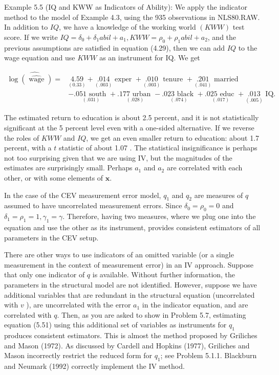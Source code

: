 \documentclass[10pt]{article}
\begin{document}
Example 5.5 (IQ and KWW as Indicators of Ability): We apply the indicator method to the model of Example 4.3, using the 935 observations in NLS80.RAW. In addition to $I Q$, we have a knowledge of the working world $(K W W)$ test score. If we write $I Q=\delta_{0}+\delta_{1} a b i l+a_{1}, K W W=\rho_{0}+\rho_{1} a b i l+a_{2}$, and the previous assumptions are satisfied in equation (4.29), then we can add $I Q$ to the wage equation and use $K W W$ as an instrument for IQ. We get

$$
\begin{aligned}
\widehat{\log (\widehat{\text { wage }})=} & \underset{(0.33)}{4.59}+\underset{(.003)}{.014} \text { exper }+\underset{(.003)}{.010} \text { tenure }+\underset{(.041)}{.201} \text { married } \\
& -\underset{(.031)}{.051 \text { south }}+\underset{(.028)}{.177 \text { urban }}-\underset{(.074)}{.023 \text { black }}+\underset{(.017)}{.025 \text { educ }}+\underset{(.005)}{.013} \text { IQ. }
\end{aligned}
$$

The estimated return to education is about 2.5 percent, and it is not statistically significant at the 5 percent level even with a one-sided alternative. If we reverse the roles of $K W W$ and $I Q$, we get an even smaller return to education: about 1.7 percent, with a $t$ statistic of about 1.07 . The statistical insignificance is perhaps not too surprising given that we are using IV, but the magnitudes of the estimates are surprisingly small. Perhaps $a_{1}$ and $a_{2}$ are correlated with each other, or with some elements of $\mathbf{x}$.

In the case of the CEV measurement error model, $q_{1}$ and $q_{2}$ are measures of $q$ assumed to have uncorrelated measurement errors. Since $\delta_{0}=\rho_{0}=0$ and $\delta_{1}= \rho_{1}=1, \gamma_{1}=\gamma$. Therefore, having two measures, where we plug one into the equation and use the other as its instrument, provides consistent estimators of all parameters in the CEV setup.

There are other ways to use indicators of an omitted variable (or a single measurement in the context of measurement error) in an IV approach. Suppose that only one indicator of $q$ is available. Without further information, the parameters in the structural model are not identified. However, suppose we have additional variables that are redundant in the structural equation (uncorrelated with $v$ ), are uncorrelated with the error $a_{1}$ in the indicator equation, and are correlated with $q$. Then, as you are asked to show in Problem 5.7, estimating equation (5.51) using this additional set of variables as instruments for $q_{1}$ produces consistent estimators. This is almost the method proposed by Griliches and Mason (1972). As discussed by Cardell and Hopkins (1977), Griliches and Mason incorrectly restrict the reduced form for $q_{1}$; see Problem 5.1.1. Blackburn and Neumark (1992) correctly implement the IV method.
\end{document}
